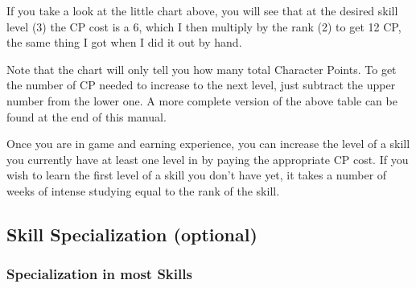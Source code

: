 \documentclass[twoside]{book}
\begin{document}
  

  
    {  
     If you take a look at the little chart above, you will
             see that at the desired skill level (3) the CP cost is a 6,
             which I then multiply by the rank (2) to get 12 CP, the same
             thing I got when I did it out by hand. 
    }
  
    {  
     Note that the chart will only tell you how many total
             Character Points. To get the number of CP needed to increase
             to the next level, just subtract the upper number from the
             lower one. A more complete version of the above table can be
             found at the end of this manual. 
    }
  
    {  
     Once you are in game and earning experience, you can
             increase the level of a skill you currently have at least
             one level in by paying the appropriate CP cost. If you wish
             to learn the first level of a skill you don't have
             yet, it takes a number of weeks of intense studying equal to
             the rank of the skill. 
    }
  
    

\subsection{Skill Specialization (optional)}
    
    

\subsubsection{Specialization in most Skills}
    
\end{document}
